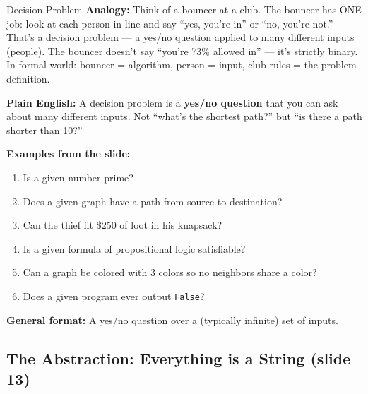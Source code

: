 \documentclass[11pt,a4paper]{article}
\begin{document}
\begin{definitionbox}{Decision Problem}
\textbf{Analogy:} Think of a bouncer at a club. The bouncer has ONE job: look at each person in line and say ``yes, you're in'' or ``no, you're not.'' That's a decision problem --- a yes/no question applied to many different inputs (people). The bouncer doesn't say ``you're 73\% allowed in'' --- it's strictly binary. In formal world: bouncer = algorithm, person = input, club rules = the problem definition.

\textbf{Plain English:} A decision problem is a \textbf{yes/no question} that you can ask about many different inputs. Not ``what's the shortest path?'' but ``is there a path shorter than 10?''

\textbf{Examples from the slide:}
\begin{enumerate}[nosep]
\item Is a given number prime?
\item Does a given graph have a path from source to destination?
\item Can the thief fit \$250 of loot in his knapsack?
\item Is a given formula of propositional logic satisfiable?
\item Can a graph be colored with 3 colors so no neighbors share a color?
\item Does a given program ever output \texttt{False}?
\end{enumerate}

\textbf{General format:} A yes/no question over a (typically infinite) set of inputs.
\end{definitionbox}

\subsection{The Abstraction: Everything is a String (slide 13)}
\end{document}
